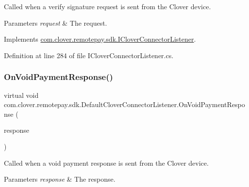Called when a verify signature request is sent from the Clover device. 


\begin{DoxyParams}{Parameters}
{\em request} & The request.\\
\hline
\end{DoxyParams}


Implements \hyperlink{interfacecom_1_1clover_1_1remotepay_1_1sdk_1_1_i_clover_connector_listener_a7150246cea38e342996a2be9a7ed3990}{com.\+clover.\+remotepay.\+sdk.\+I\+Clover\+Connector\+Listener}.



Definition at line 284 of file I\+Clover\+Connector\+Listener.\+cs.

\mbox{\label{classcom_1_1clover_1_1remotepay_1_1sdk_1_1_default_clover_connector_listener_acbffe77e24ba64632018d6c68dcdda33}} 
\subsubsection{\texorpdfstring{On\+Void\+Payment\+Response()}{OnVoidPaymentResponse()}}
{\footnotesize\ttfamily virtual void com.\+clover.\+remotepay.\+sdk.\+Default\+Clover\+Connector\+Listener.\+On\+Void\+Payment\+Response (\begin{DoxyParamCaption}\item[{\hyperlink{classcom_1_1clover_1_1remotepay_1_1sdk_1_1_void_payment_response}{Void\+Payment\+Response}}]{response }\end{DoxyParamCaption})\hspace{0.3cm}{\ttfamily [virtual]}}



Called when a void payment response is sent from the Clover device. 


\begin{DoxyParams}{Parameters}
{\em response} & The response.\\
\hline
\end{DoxyParams}


